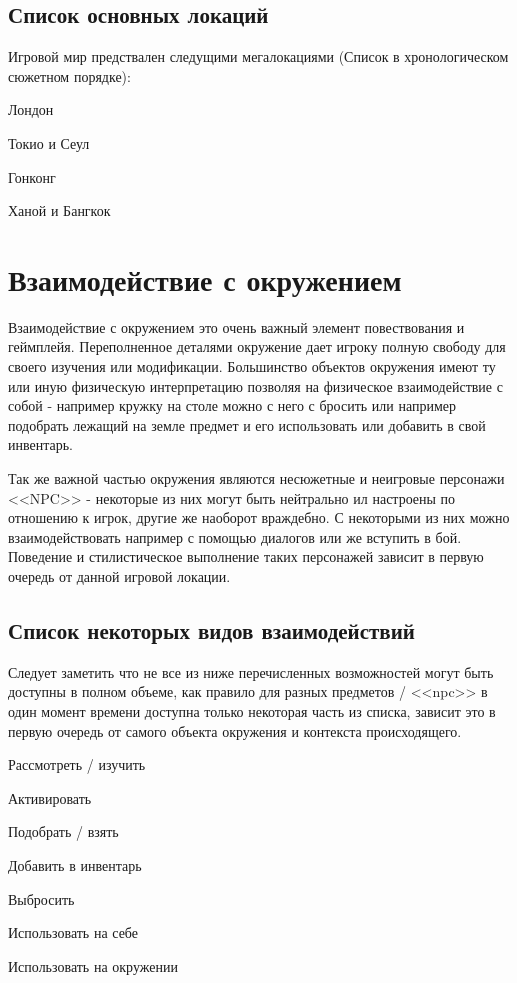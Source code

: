 \documentclass[11pt]{report}
\newenvironment{itemize*}%
  {\begin{itemize}%
    \setlength{\itemsep}{2pt}%
    \setlength{\parskip}{0.75pt}}%
  {\end{itemize}}
\newenvironment{enumerate*}%
  {\begin{enumerate}%
    \setlength{\itemsep}{2pt}%
    \setlength{\parskip}{0.75pt}}%
  {\end{enumerate}}
\begin{document}
\subsection{Список основных локаций}
Игровой мир предствален следущими мегалокациями (Список в хронологическом сюжетном порядке): \begin{enumerate*}
\item Лондон
\item Токио и Сеул
\item Гонконг
\item Ханой и Бангкок
\end{enumerate*}

\section{Взаимодействие с окружением}
Взаимодействие с окружением это очень важный элемент повествования и геймплейя. Переполненное деталями окружение дает игроку полную свободу для своего изучения или модификации. Большинство объектов окружения имеют ту или иную физическую интерпретацию позволяя на физическое взаимодействие с собой - например кружку на столе можно с него с бросить или например подобрать лежащий на земле предмет и его использовать или добавить в свой инвентарь. 

Так же важной частью окружения являются несюжетные и неигровые персонажи <<NPC>> - некоторые из них могут быть нейтрально ил настроены по отношению к игрок, другие же наоборот враждебно. С некоторыми из них можно взаимодействовать например с помощью диалогов или же вступить в бой. Поведение и стилистическое выполнение таких персонажей зависит в первую очередь от данной игровой локации.
\subsection{Список некоторых видов взаимодействий}
Следует заметить что не все из ниже перечисленных возможностей могут быть доступны в полном объеме, как правило для разных предметов / <<npc>> в один момент времени доступна только некоторая часть из списка, зависит это в первую очередь от самого объекта окружения и контекста происходящего. \begin{itemize*}
\item Рассмотреть / изучить
\item Активировать
\item Подобрать / взять
\item Добавить в инвентарь
\item Выбросить 
\item Использовать на себе
\item Использовать на окружении\\
\end{itemize*}
\end{document}
